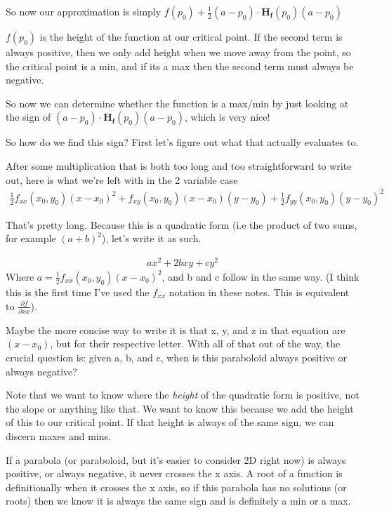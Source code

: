 \documentclass[12pt, letterpaper]{article}
\begin{document}
So now our approximation is simply $f(p_0) + \frac{1}{2}(a - p_0) \cdot \mathbf{H_f}(p_0)(a - p_0)$

$f(p_0)$ is the height of the function at our critical point. If the second term is always positive, then we only add height when we move away from the point, so the critical point is a min, and if its a max then the second term must always be negative.

So now we can determine whether the function is a max/min by just looking at the sign of $(a - p_0) \cdot \mathbf{H_f}(p_0)(a - p_0)$, which is very nice!

So how do we find this sign? First let's figure out what that actually evaluates to.

After some multiplication that is both too long and too straightforward to write out, here is what we're left with in the 2 variable case
\begin{gather*}
    \frac{1}{2}f_{xx}(x_0, y_0)(x - x_0)^2 + f_{xy}(x_0, y_0)(x - x_0)(y - y_0) + \frac{1}{2}f_{yy}(x_0, y_0)(y - y_0)^2
\end{gather*}

That's pretty long. Because this is a quadratic form (i.e the product of two sums, for example $(a+b)^2$), let's write it as such.

\begin{gather*}
    ax^2 + 2bxy + cy^2
\end{gather*}
Where $a = \frac{1}{2}f_{xx}(x_0, y_0)(x - x_0)^2$, and b and c follow in the same way.
(I think this is the first time I've used the $f_{xx}$ notation in these notes. This is equivalent to $\frac{\partial f}{\partial xx}$).

Maybe the more concise way to write it is that x, y, and z in that equation are $(x - x_0)$, but for their respective letter. With all of that out of the way, the crucial question is: given a, b, and c, when is this paraboloid always positive or always negative?

Note that we want to know where the \textit{height} of the quadratic form is positive, not the slope or anything like that. We want to know this because we add the height of this to our critical point. If that height is always of the same sign, we can discern maxes and mins.

If a parabola (or paraboloid, but it's easier to consider 2D right now) is always positive, or always negative, it never crosses the x axis. A root of a function is definitionally when it crosses the x axis, so if this parabola has no solutions (or roots) then we know it is always the same sign and is definitely a min or a max.
\end{document}
